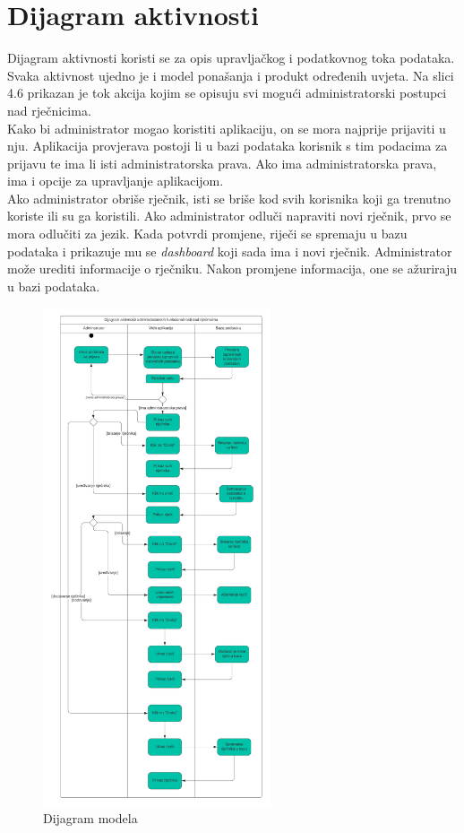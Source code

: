 		\section{Dijagram aktivnosti}
        Dijagram aktivnosti koristi se za opis upravljačkog i podatkovnog toka podataka. Svaka aktivnost ujedno je i model ponašanja i produkt određenih uvjeta. Na slici 4.6 prikazan je tok akcija kojim se opisuju svi mogući administratorski postupci nad rječnicima. \newline
        \\
        Kako bi administrator mogao koristiti aplikaciju, on se mora najprije prijaviti u nju. Aplikacija provjerava postoji li u bazi podataka korisnik s tim podacima za prijavu te ima li isti administratorska prava.
        Ako ima administratorska prava, ima i opcije za upravljanje aplikacijom.
        \newline
        \\
         Ako administrator obriše rječnik, isti se briše kod svih korisnika koji ga trenutno koriste ili su ga koristili. Ako administrator odluči napraviti novi rječnik, prvo se mora odlučiti za jezik. Kada potvrdi promjene, riječi se spremaju u bazu podataka i prikazuje mu se  \textit{dashboard} koji sada ima i novi rječnik. Administrator može urediti informacije o rječniku. Nakon promjene informacija, one se ažuriraju u bazi podataka.
        \begin{figure}[H]
            \includegraphics[width=0.6\textwidth]{dijagrami/Dijagram Aktivnosti.png} 
            \centering
            \caption{Dijagram modela}
            \label{fig:class_diagram}
        \end{figure}	

